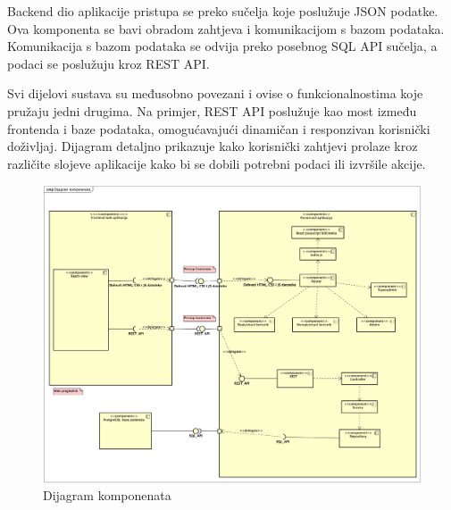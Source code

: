 			 Backend dio aplikacije pristupa se preko sučelja koje poslužuje JSON podatke. Ova komponenta se bavi obradom zahtjeva i komunikacijom s bazom podataka. Komunikacija s bazom podataka se odvija preko posebnog SQL API sučelja, a podaci se poslužuju kroz REST API.
			 
			 Svi dijelovi sustava su međusobno povezani i ovise o funkcionalnostima koje pružaju jedni drugima. Na primjer, REST API poslužuje kao most između frontenda i baze podataka, omogućavajući dinamičan i responzivan korisnički doživljaj. Dijagram detaljno prikazuje kako korisnički zahtjevi prolaze kroz različite slojeve aplikacije kako bi se dobili potrebni podaci ili izvršile akcije.
			 
			 \begin{figure}[H]
			 	\includegraphics[scale=0.45]{dijagrami/dijagram_komponenata.png}%
			 	\centering
			 	\caption{Dijagram komponenata}
			 	\label{fig:promjene}
			 \end{figure}
		